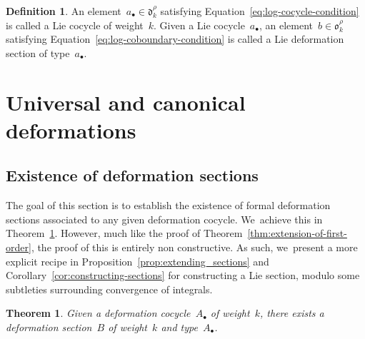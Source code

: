\documentclass[10pt,a4paper]{article}
\numberwithin{equation}{section}
\let\oldbullet\bullet
\renewcommand{\bullet}{{\scriptscriptstyle\oldbullet}}
\theoremstyle{plain}
\newtheorem{theorem}[theoremcounter]{Theorem}
\theoremstyle{definition}
\newtheorem{definition}[theoremcounter]{Definition}
\newcommand{\frakd}{\ensuremath{\mathfrak{d}}}
\newcommand{\frako}{\ensuremath{\mathfrak{o}}}
\begin{document}
\begin{definition}\label{def:log-deformation-data}
An element~$a_\bullet\in\frakd_k^\rho$ satisfying Equation~\eqref{eq:log-cocycle-condition} is called a Lie cocycle of weight~$k$. Given a Lie cocycle~$a_\bullet$, an element~$b\in\frako_k^\rho$ satisfying Equation~\eqref{eq:log-coboundary-condition} is called a Lie deformation section of type~$a_\bullet$.
\end{definition}

\setcounter{section}{3}
\section{Universal and canonical deformations}\label{sec:universal_canonical}
\setcounter{subsection}{1}
\setcounter{theoremcounter}{2}
\setcounter{equation}{1}

\subsection{Existence of deformation sections}
\label{ssec:existence_deformation_section}

The goal of this section is to establish the existence of formal deformation sections associated to any given deformation cocycle. We~achieve this in Theorem~\ref{thm:existence_and_uniqueness_of_section}. However, much like the proof of Theorem~\ref{thm:extension-of-first-order}, the proof of this is entirely non constructive. As such, we~present a more explicit recipe in Proposition~\ref{prop:extending_sections} and Corollary~\ref{cor:constructing-sections} for constructing a Lie section, modulo some subtleties surrounding convergence of integrals.


\begin{theorem}
\label{thm:existence_and_uniqueness_of_section}
Given a deformation cocycle~$A_\bullet$ of weight~$k$, there exists a deformation section~$B$ of weight~$k$ and type~$A_\bullet$.
\end{theorem}
\end{document}
